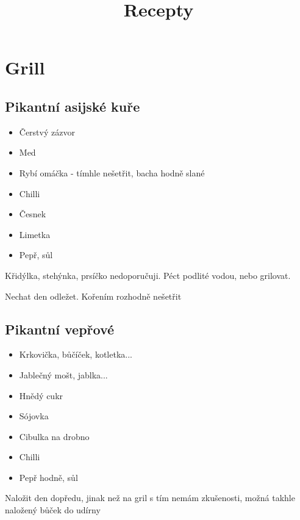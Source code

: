 \documentclass[10pt,a4paper]{article}
\newenvironment{myitemize}
{ \begin{itemize}
    \setlength{\itemsep}{0pt}
    \setlength{\parskip}{0pt}
    \setlength{\parsep}{0pt}     }
{ \end{itemize}                  }
\begin{document}
\title{Recepty}
\maketitle
\tableofcontents
\pagebreak
\section{Grill}

\subsection{Pikantní asijské kuře}
\begin{minipage}[t]{0,5\textwidth}
\begin{myitemize} 
  \item Čerstvý zázvor 
  \item Med
  \item Rybí omáčka - tímhle nešetřit, bacha hodně slané
  \item Chilli
  \item Česnek
  \item Limetka
  \item Pepř, sůl 
  
\end{myitemize}
\end{minipage}
\begin{minipage}[t]{0,5\textwidth}
Křidýlka, stehýnka, prsíčko nedoporučuji. Péct podlité vodou, nebo grilovat.

Nechat den odležet. Kořením rozhodně nešetřit
\end{minipage}



\subsection{Pikantní vepřové}
\begin{minipage}[t]{0,5\textwidth}
\begin{myitemize} 
  \item Krkovička, bůčíček, kotletka... 
  \item Jablečný mošt, jablka...
  \item Hnědý cukr
  \item Sójovka
  \item Cibulka na drobno
  \item Chilli
  \item Pepř hodně, sůl 
  
\end{myitemize}
\end{minipage}
\begin{minipage}[t][5cm][t]{0,5\textwidth}
Naložit den dopředu, jinak než na gril s tím nemám zkušenosti, možná takhle naložený bůček do udírny 
\end{minipage}
\end{document}
